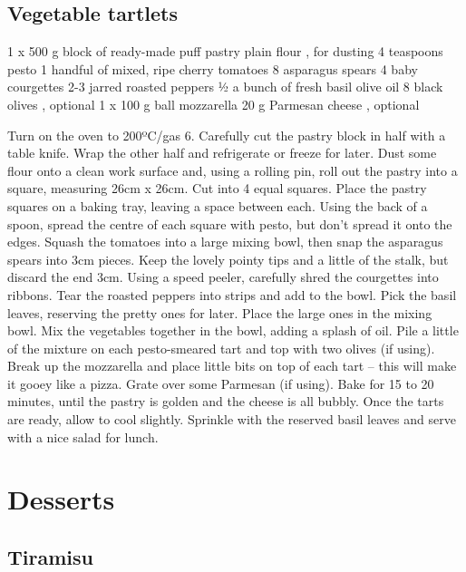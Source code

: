 \documentclass[
]{book}
\begin{document}
\hypertarget{vegetable-tartlets}{%
\section{Vegetable tartlets}\label{vegetable-tartlets}}

1 x 500 g block of ready-made puff pastry
plain flour , for dusting
4 teaspoons pesto
1 handful of mixed, ripe cherry tomatoes
8 asparagus spears
4 baby courgettes
2-3 jarred roasted peppers
½ a bunch of fresh basil
olive oil
8 black olives , optional
1 x 100 g ball mozzarella
20 g Parmesan cheese , optional

Turn on the oven to 200ºC/gas 6. Carefully cut the pastry block in half with a table knife. Wrap the other half and refrigerate or freeze for later.
Dust some flour onto a clean work surface and, using a rolling pin, roll out the pastry into a square, measuring 26cm x 26cm. Cut into 4 equal squares.
Place the pastry squares on a baking tray, leaving a space between each.
Using the back of a spoon, spread the centre of each square with pesto, but don't spread it onto the edges.
Squash the tomatoes into a large mixing bowl, then snap the asparagus spears into 3cm pieces. Keep the lovely pointy tips and a little of the stalk, but discard the end 3cm.
Using a speed peeler, carefully shred the courgettes into ribbons. Tear the roasted peppers into strips and add to the bowl.
Pick the basil leaves, reserving the pretty ones for later. Place the large ones in the mixing bowl.
Mix the vegetables together in the bowl, adding a splash of oil. Pile a little of the mixture on each pesto-smeared tart and top with two olives (if using).
Break up the mozzarella and place little bits on top of each tart -- this will make it gooey like a pizza. Grate over some Parmesan (if using).
Bake for 15 to 20 minutes, until the pastry is golden and the cheese is all bubbly.
Once the tarts are ready, allow to cool slightly. Sprinkle with the reserved basil leaves and serve with a nice salad for lunch.

\hypertarget{desserts}{%
\chapter{Desserts}\label{desserts}}

\hypertarget{tiramisu}{%
\section{Tiramisu}\label{tiramisu}}
\end{document}
